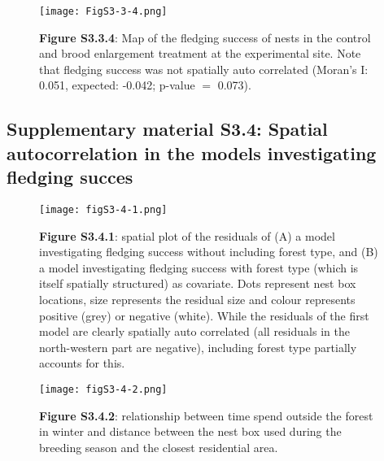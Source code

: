 \documentclass[10pt, twoside]{book} %
\begin{document}
\begin{figure}[th!]
	\begin{center}
		\texttt{[image: FigS3-3-4.png]}
	\end{center}
	\caption*{\textbf{Figure S3.3.4}: Map of the fledging success of nests in the control and brood enlargement treatment at the experimental site. Note that fledging success was not spatially auto correlated (Moran's I: 0.051, expected: -0.042; p-value $=$ 0.073).}
\end{figure}

%
\clearpage
\subsection*{Supplementary material S3.4: Spatial autocorrelation in the models investigating fledging succes}

\begin{figure}[h!]
	\begin{center}
		\texttt{[image: figS3-4-1.png]}
	\end{center}
	\caption*{\textbf{Figure S3.4.1}: spatial plot of the residuals of (A) a model investigating fledging success without including forest type, and (B) a model investigating fledging success with forest type (which is itself spatially structured) as covariate. Dots represent nest box locations, size represents the residual size and colour represents positive (grey) or negative (white). While the residuals of the first model are clearly spatially auto correlated (all residuals in the north-western part are negative), including forest type partially accounts for this.}
\end{figure}

\begin{figure}[h!]
	\begin{center}
		\texttt{[image: figS3-4-2.png]}
	\end{center}
	\caption*{\textbf{Figure S3.4.2}: relationship between time spend outside the forest in winter and distance between the nest box used during the breeding season and the closest residential area.}
\end{figure}



\cleardoublepage
\thispagestyle{plain}
\hbox{}
\clearpage
	\newpage{\thispagestyle{empty}\cleardoublepage}
	\ClearWallPaper
	\pagestyle{mainmatter}
\end{document}
